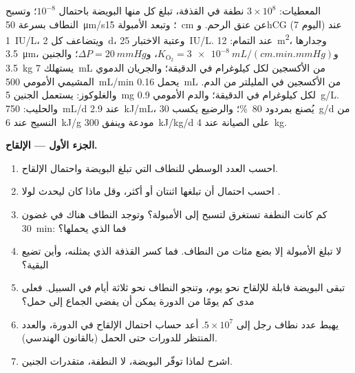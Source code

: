 \begin{problem}
\label{pb:b2:mammal-reproduction:1}
المعطيات: $3\times 10^{8}$ نطفة في القذفة، تبلغ كل منها البويضة
باحتمال $10^{-8}$؛ وتسبح النطاف بسرعة \qty{50}{\micro m/s}؛ وتبعد
الأمبولة \qty{15}{cm} عن عنق الرحم. وhCG عند  (اليوم 7)
\qty{1}{IU/L}، ويتضاعف كل \qty{2}{d}، وعتبة الاختبار
\qty{25}{IU/L}.  عند التمام: \qty{12}{m^2}، وجدارها
\qty{3.5}{\micro m}، و$K_{\mathrm{O_2}} = \qty{3e-8}{mL/(cm.min.mmHg)}$،
و$\Delta P = \qty{20}{mmHg}$؛ والجنين \qty{3.5}{kg} يستهلك
\qty{7}{mL} من الأكسجين لكل كيلوغرام في الدقيقة؛ والجريان الدموي
المشيمي الأمومي \qty{500}{mL/min} يحمل \qty{0.16}{mL} من الأكسجين في
المليلتر من الدم. والغلوكوز: يستعمل الجنين \qty{5}{mg} لكل كيلوغرام في
الدقيقة؛ والدم الأمومي \qty{0.9}{g/L}. والحليب: \qty{750}{mL/d} عند
\qty{2.9}{kJ/mL}، يُصنع بمردود \qty{80}{\%}؛ والرضيع يكسب
\qty{30}{g/d} من النسيج عند \qty{6}{kJ/g} مودعة وينفق
\qty{300}{kJ/kg/d} على الصيانة عند \qty{4}{kg}.

\medskip
\noindent\textbf{الجزء الأول --- الإلقاح.}
\begin{enumerate}
  \item احسب العدد الوسطي للنطاف التي تبلغ البويضة واحتمال
        الإلقاح.
  \item احسب احتمال أن تبلغها اثنتان أو أكثر، وقل ماذا كان
        ليحدث لولا .
  \item كم كانت النطفة تستغرق لتسبح إلى الأمبولة؟ وتوجد النطاف
        هناك في غضون \qty{30}{min}: فما الذي يحملها؟
  \item لا تبلغ الأمبولة إلا بضع مئات من النطاف. فما كسر
        القذفة الذي يمثلنه، وأين تضيع البقية؟
  \item تبقى البويضة قابلة للإلقاح نحو يوم، وتنجو النطاف نحو
        ثلاثة أيام في السبيل. فعلى مدى كم يومًا من الدورة يمكن
        أن يفضي الجماع إلى حمل؟
  \item يهبط عدد نطاف رجل إلى $5\times 10^{7}$. أعد حساب
        احتمال الإلقاح في الدورة، والعدد المنتظر للدورات حتى
        الحمل (بالقانون الهندسي).
  \item اشرح لماذا توفّر البويضة، لا النطفة، متقدرات الجنين.
\end{enumerate}


\end{problem}
